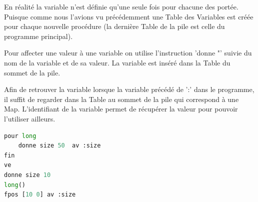 \documentclass[a4paper,11pt]{article}
\begin{document}
En réalité la variable n'est définie qu'une seule fois pour chacune des portée. Puisque comme nous l'avions vu précédemment une Table des Variables est créée pour chaque nouvelle procédure (la dernière Table de la pile est celle du programme principal).

Pour affecter une valeur à une variable on utilise l'instruction 'donne "' suivie du nom de la variable et de sa valeur. La variable est inséré dans la Table du sommet de la pile.

Afin de retrouver la variable lorsque la variable précédé de ':' dans le programme, il suffit de regarder dans la Table au sommet de la pile qui correspond à une Map. 
L'identifiant de la variable permet de récupérer la valeur pour pouvoir l'utiliser ailleurs.
\begin{lstlisting}[language=Python]
pour long
	donne size 50  av :size
fin
ve
donne size 10 
long() 
fpos [10 0] av :size
\end{lstlisting}
\end{document}
